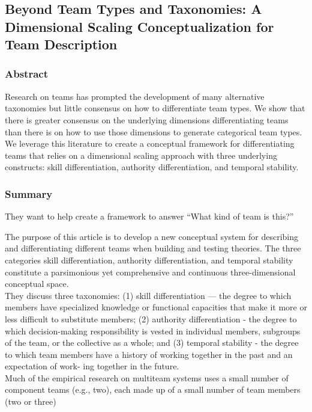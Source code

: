 \documentclass[12pt]{article}
\begin{document}

\subsection*{Beyond Team Types and Taxonomies: A Dimensional Scaling Conceptualization for Team Description\cite{team_description}}

\subsubsection*{Abstract}

Research on teams has prompted the development of many alternative taxonomies but little consensus on how to differentiate team types. We show that there is greater consensus on the underlying dimensions differentiating teams than there is on how to use those dimensions to generate categorical team types. We leverage this literature to create a conceptual framework for differentiating teams that relies on a dimensional scaling approach with three underlying constructs: skill differentiation, authority differentiation, and temporal stability.

\subsubsection*{Summary}

They want to help create a framework to answer “What kind of team is this?”

The purpose of this article is to develop a new conceptual system for describing and differentiating different teams when building and testing theories. The three categories skill differentiation, authority differentiation, and temporal stability constitute a parsimonious yet comprehensive and continuous three-dimensional conceptual space.\\

They discuss three taxonomies:  (1) skill differentiation — the degree to which members have specialized knowledge or functional capacities that make it more or less difficult to substitute members; (2) authority differentiation - the degree to which decision-making responsibility is vested in individual members, subgroups of the team, or the collective as a whole; and (3) temporal stability - the degree to which team members have a history of working together in the past and an expectation of work- ing together in the future.\\

Much of the empirical research on multiteam systems uses a small number of component teams (e.g., two), each made up of a small number of team members (two or three)\\
\end{document}
